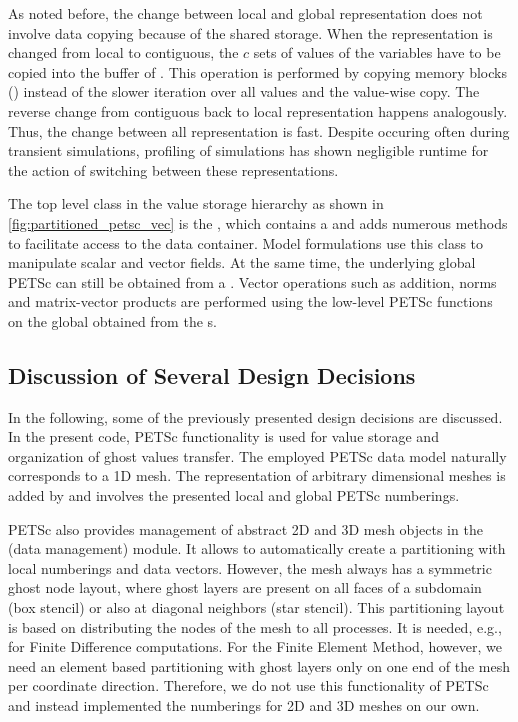 As noted before, the change between local and global representation does not involve data copying because of the shared storage.
When the representation is changed from local to contiguous, the $c$ sets of values of the  variables have to be copied into the buffer of . This operation is performed by copying memory blocks  \mbox{()} instead of the slower iteration over all values and the value-wise copy. The reverse change from contiguous back to local representation happens analogously. Thus, the change between all representation is fast. Despite occuring often during transient simulations, profiling of simulations has shown negligible runtime for the action of switching between these representations.

The top level class in the value storage hierarchy as shown in \cref{fig:partitioned_petsc_vec} is the , which contains a  and adds numerous methods to facilitate access to the data container. Model formulations use this class to manipulate scalar and vector fields. At the same time, the underlying global PETSc \Vec{} can still be obtained from a . Vector operations such as addition, norms and matrix-vector products are performed using the low-level PETSc functions on the global \Vec{} obtained from the s.

\subsection{Discussion of Several Design Decisions}
In the following, some of the previously presented design decisions are discussed.
In the present code, PETSc functionality is used for value storage and organization of ghost values transfer. 
The employed PETSc data model naturally corresponds to a 1D mesh.
The representation of arbitrary dimensional meshes is added by \opendihu{} and involves the presented local and global PETSc numberings. 

PETSc also provides management of abstract 2D and 3D mesh objects in the  (data management) module. It allows to automatically create a partitioning with local numberings and data vectors. However, the mesh always has a symmetric ghost node layout, where ghost layers are present on all faces of a subdomain (box stencil) or also at diagonal neighbors (star stencil). This partitioning layout is based on distributing the nodes of the mesh to all processes. It is needed, e.g., for Finite Difference computations. For the Finite Element Method, however, we need an element based partitioning with ghost layers only on one end of the mesh per coordinate direction. Therefore, we do not use this functionality of PETSc and instead implemented the numberings for 2D and 3D meshes on our own.


